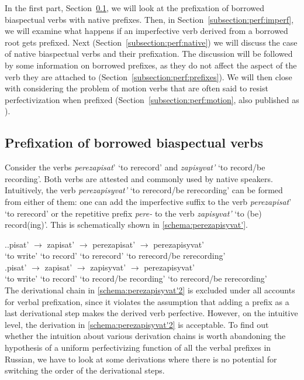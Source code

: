 In the first part, Section~\ref{subsection:perf:borrowed}, we will look at the prefixation of borrowed biaspectual verbs with native prefixes. Then, in Section~\ref{subsection:perf:imperf}, we will examine what happens if an imperfective verb derived from a borrowed root gets prefixed. Next (Section~\ref{subsection:perf:native}) we will discuss the case of native biaspectual verbs and their prefixation. The discussion will be followed by some information on borrowed prefixes, as they do not affect the aspect of the verb they are attached to (Section~\ref{subsection:perf:prefixes}). We will then close with considering the problem of motion verbs that are often said to resist perfectivization when prefixed (Section~\ref{subsection:perf:motion}, also published as \citealt{ZinovaOsswald:paper}).

\subsection{Prefixation of borrowed biaspectual verbs}\label{subsection:perf:borrowed}
Consider the verbs \textit{perezapisat}'\textsuperscript{\PF} `to rerecord' and \textit{zapisyvat'}\textsuperscript{\IPF} `to  record/be recording'. Both verbs are attested and commonly used by native speakers. Intuitively, the verb \textit{perezapisyvat'} `to rerecord/be rerecording' can be formed from either of them: one can add the imperfective suffix to the verb \textit{perezapisat}'\textsuperscript{\PF} `to rerecord' or the repetitive prefix \textit{pere-} to the verb \textit{zapisyvat'}\textsuperscript{\IPF} `to (be) record(ing)'. This is schematically shown in \ref{schema:perezapisyvat'}.

\ex.\label{schema:perezapisyvat'}\ag.\label{schema:perezapisyvat'1}pisat'\textsuperscript{\IPF} {$\rightarrow$} zapisat'\textsuperscript{\PF} {$\rightarrow$} perezapisat'\textsuperscript{\PF} {$\rightarrow$} perezapisyvat'\textsuperscript{\IPF} \\
{`to write'} {} {`to record'} {} {`to rerecord'} {} {`to rerecord/be rerecording'}\\
\bg.\label{schema:perezapisyvat'2}pisat'\textsuperscript{\IPF} {$\rightarrow$} zapisat'\textsuperscript{\PF} {$\rightarrow$} zapisyvat'\textsuperscript{\IPF} {$\rightarrow$} perezapisyvat'\textsuperscript{\IPF} \\
{`to write'} {} {`to record'} {} {`to record/be recording'} {} {`to rerecord/be rerecording'}\\

The derivational chain in \ref{schema:perezapisyvat'2} is excluded under all accounts for verbal prefixation, since it violates the assumption that adding a prefix as a last derivational step makes the derived verb perfective. However, on the intuitive level, the derivation in \ref{schema:perezapisyvat'2} is acceptable. To find out whether the intuition about various derivation chains is worth abandoning the hypothesis of a uniform perfectivizing function of all the verbal prefixes in Russian, we have to look at some derivations where there is no potential for switching the order of the derivational steps.

